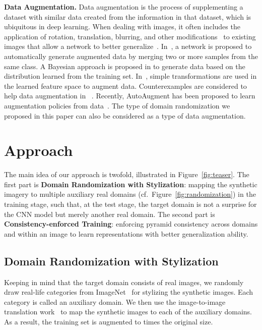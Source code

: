 \documentclass[10pt,twocolumn,letterpaper]{article}
\begin{document}
\textbf{Data Augmentation.}
Data augmentation is the process of supplementing a dataset with similar data created from the information in that dataset, which is ubiquitous in deep learning. When dealing with images, it often includes the application of rotation, translation, blurring, and other modifications~\cite{ciregan2012multicolumn, wan2013regularization, sato2015apac} to existing images that allow a network to better generalize~\cite{simard2003best}. In~\cite{lemley2017smart}, a network is proposed to automatically generate augmented data by merging two or more samples from the same class. A Bayesian approach is proposed in \cite{tran2017bayesian} to generate data based on the distribution learned from the training set. In~\cite{devries2017dataset},  simple transformations are used in the learned feature space to augment data. Counterexamples are considered to help data augmentation in ~\cite{dreossi2018counterexample}. Recently, AutoAugment has been proposed to learn augmentation policies from data~\cite{cubuk2018autoaugment}. The type of domain randomization we proposed in this paper can also be considered as a type of data augmentation. 




\section{Approach}

The main idea of our approach is twofold, illustrated in Figure~\ref{fig:teaser}. The first part is \textbf{Domain Randomization with Stylization}: mapping the synthetic imagery to multiple auxiliary real domains (cf.\ Figure~\ref{fig:randomization}) in the training stage, such that, at the test stage, the target domain is not a surprise for the CNN model but merely another real domain. The second part is \textbf{Consistency-enforced Training}: enforcing pyramid consistency across domains and within an image to learn representations with better generalization ability. 



\subsection{Domain Randomization with Stylization}
Keeping in mind that the target domain consists of real images, we randomly draw  real-life categories from  ImageNet~\cite{deng2009imagenet}  for stylizing the synthetic images. Each category is called an auxiliary domain. We then use the image-to-image translation work~\cite{CycleGAN2017} to map the synthetic images to each of the auxiliary domains. As a result, the training set is augmented to  times the original size.
\end{document}
